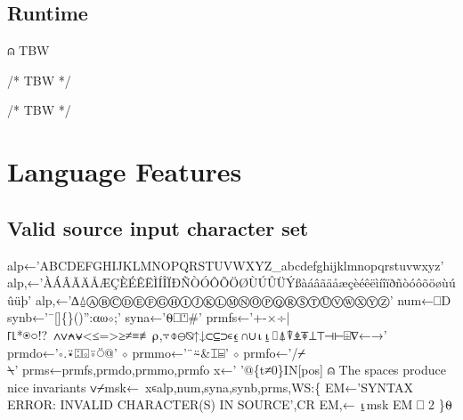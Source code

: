 \documentclass{article}%
\begin{document}
\subsection{Runtime}

\nwenddocs{}\endmoddef\nwstartdeflinemarkup\nwenddeflinemarkup
⍝ TBW
\nwendcode{}\nwdocspar

\nwenddocs{}\endmoddef\nwstartdeflinemarkup\nwenddeflinemarkup
/* TBW */
\nwendcode{}\nwdocspar

\nwenddocs{}\endmoddef\nwstartdeflinemarkup\nwenddeflinemarkup
/* TBW */
\nwendcode{}\nwdocspar

\section{Language Features}

\subsection{Valid source input character set}

\nwenddocs{}\endmoddef\nwstartdeflinemarkup{}\nwenddeflinemarkup
alp←'ABCDEFGHIJKLMNOPQRSTUVWXYZ_abcdefghijklmnopqrstuvwxyz'
alp,←'ÀÁÂÃÄÅÆÇÈÉÊËÌÍÎÏÐÑÒÓÔÕÖØÙÚÛÜÝßàáâãäåæçèéêëìíîïðñòóôõöøùúûüþ'
alp,←'∆⍙ⒶⒷⒸⒹⒺⒻⒼⒽⒾⒿⓀⓁⓂⓃⓄⓅⓆⓇⓈⓉⓊⓋⓌⓍⓎⓏ'
num←⎕D
synb←'¯[]\{\}()'':⍺⍵⋄;'
syna←'⍬⎕⍞#'
prmfs←'+-×÷|⌈⌊*⍟○!?~∧∨⍲⍱<≤=>≥≠≡≢⍴,⍪⌽⊖⍉↑↓⊂⊆⊃∊⍷∩∪⍳⍸⌷⍋⍒⍎⍕⊥⊤⊣⊢⌹∇←→'
prmdo←'∘.⍣⍠⌺⍤⍥@' ⋄ prmmo←'¨⍨&⌶⌸' ⋄ prmfo←'/⌿\\⍀'
prms←prmfs,prmdo,prmmo,prmfo
x←' '@\{t≠0\}IN[pos] ⍝ The spaces produce nice invariants
∨⌿msk←~x∊alp,num,syna,synb,prms,WS:\{
        EM←'SYNTAX ERROR: INVALID CHARACTER(S) IN SOURCE',CR
        EM,← ⍸msk
        EM ⎕ 2
\}⍬
\nwendcode{}\nwdocspar
\end{document}
